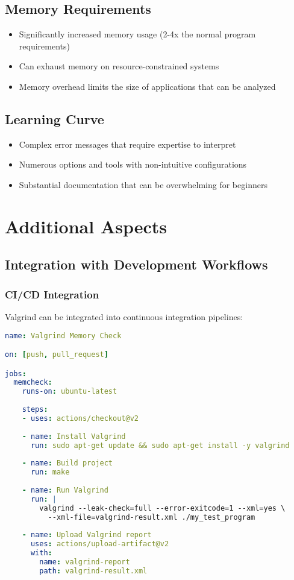 \documentclass[11pt,a4paper]{article}
\begin{document}
\subsection{Memory Requirements}
\begin{itemize}
    \item Significantly increased memory usage (2-4x the normal program requirements)
    \item Can exhaust memory on resource-constrained systems
    \item Memory overhead limits the size of applications that can be analyzed
\end{itemize}

\subsection{Learning Curve}
\begin{itemize}
    \item Complex error messages that require expertise to interpret
    \item Numerous options and tools with non-intuitive configurations
    \item Substantial documentation that can be overwhelming for beginners
\end{itemize}

\section{Additional Aspects}

\subsection{Integration with Development Workflows}

\subsubsection{CI/CD Integration}
Valgrind can be integrated into continuous integration pipelines:

\begin{lstlisting}[caption=Example CI configuration (GitHub Actions), language=yaml]
name: Valgrind Memory Check

on: [push, pull_request]

jobs:
  memcheck:
    runs-on: ubuntu-latest
    
    steps:
    - uses: actions/checkout@v2
    
    - name: Install Valgrind
      run: sudo apt-get update && sudo apt-get install -y valgrind
      
    - name: Build project
      run: make
      
    - name: Run Valgrind
      run: |
        valgrind --leak-check=full --error-exitcode=1 --xml=yes \
          --xml-file=valgrind-result.xml ./my_test_program
    
    - name: Upload Valgrind report
      uses: actions/upload-artifact@v2
      with:
        name: valgrind-report
        path: valgrind-result.xml
\end{lstlisting}
\end{document}
